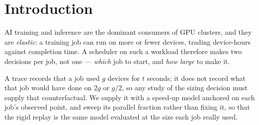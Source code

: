 \documentclass[conference]{IEEEtran}
\begin{document}
\section{Introduction}

AI training and inference are the dominant consumers of GPU clusters, and they are
\emph{elastic}: a training job can run on more or fewer devices, trading device-hours against
completion time. A scheduler on such a workload therefore makes two decisions per job, not one
--- \emph{which} job to start, and \emph{how large} to make it.

A trace records that a job used $g$ devices for $t$ seconds; it does not record what that job would
have done on $2g$ or $g/2$, so any study of the sizing decision must supply that counterfactual. We
supply it with a speed-up model anchored on each job's observed point, and sweep its parallel fraction
rather than fixing it, so that the rigid replay is the same model evaluated at the size each job really
used.
\end{document}
